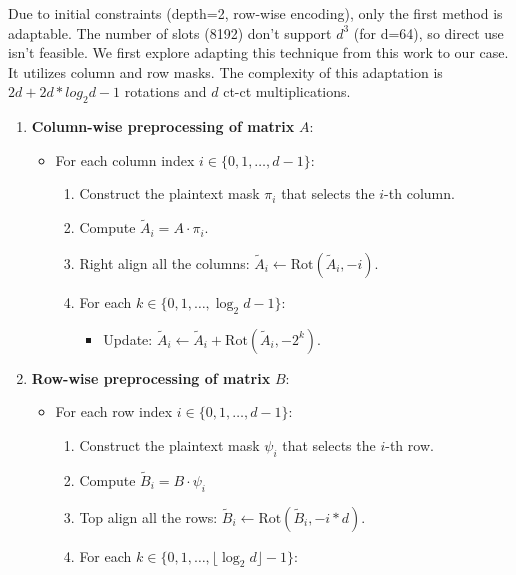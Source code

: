 \documentclass[article]{iacrtrans}
\begin{document}
Due to initial constraints (depth=2, row-wise encoding), only the first method is adaptable. The number of slots (8192) don't support $d^3$ (for d=64), so direct use isn't feasible. We first explore adapting this technique \cite{zheng} from this work to our case. It utilizes column and row masks. The complexity of this adaptation is $2d + 2d*log_{2}d - 1$ rotations and $d$ ct-ct multiplications. 


\begin{enumerate}
    \item \textbf{Column-wise preprocessing of matrix } $A$: 
        \begin{itemize}
            \item For each column index $i \in \{0, 1, \dots, d-1\}$:
                \begin{enumerate}
                    \item Construct the plaintext mask $\pi_i$ that selects the $i$-th column.
                    \item Compute $\tilde{A}_i = A \cdot \pi_i$.
                    \item Right align all the columns: $\tilde{A}_i \gets \mathrm{Rot}(\tilde{A}_i, -i)$.
                    \item For each $k \in \{0, 1, \dots,  \log_2 d  - 1\}$:
                        \begin{itemize}
                            \item Update: $\tilde{A}_i \gets \tilde{A}_i + \mathrm{Rot}(\tilde{A}_i, -2^k)$.
                        \end{itemize}
                \end{enumerate}
        \end{itemize}
    \item \textbf{Row-wise preprocessing of matrix } $B$: 
        \begin{itemize}
            \item For each row index $i \in \{0, 1, \dots, d-1\}$:
                \begin{enumerate}
                    \item Construct the plaintext mask $\psi_i$ that selects the $i$-th row.
                    \item Compute $\tilde{B}_i = B \cdot \psi_i$
                    \item Top align all the rows: $\tilde{B}_i \gets \mathrm{Rot}(\tilde{B}_i, -i*d)$.
                    \item For each $k \in \{0, 1, \dots, \lfloor \log_2 d \rfloor - 1\}$:

\end{enumerate}
\end{itemize}
\end{enumerate}
\end{document}
